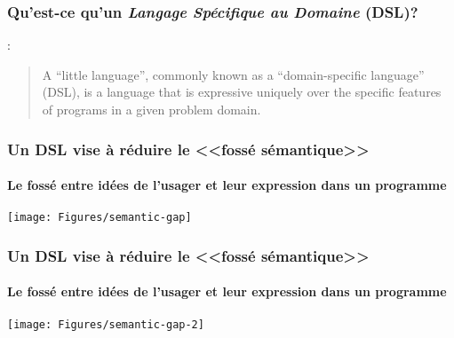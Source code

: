 \begin{frame}
\frametitle{Qu'est-ce qu'un \emph{Langage Sp\'ecifique au Domaine} (DSL)?}

\large{}:

\begin{quote}
A ``little language'', commonly known as a ``domain-specific
language'' (DSL), is a language that is \alert{expressive uniquely
over the specific features of programs in a given problem domain.}

\bigskip

\end{quote}

\NOTEvide

\end{frame}


\begin{frame}
\frametitle{Un DSL vise \`a r\'eduire le <<foss\'e
s\'emantique>>}
\framesubtitle{Le foss\'e entre id\'ees de l'usager et leur expression
dans un programme}

\hspace*{0.4cm}\texttt{[image: Figures/semantic-gap]}

\NOTE{\ }

\end{frame}

\begin{frame}
\frametitle{Un DSL vise \`a r\'eduire le <<foss\'e
s\'emantique>>}
\framesubtitle{Le foss\'e entre id\'ees de l'usager et leur expression
dans un programme}

\hspace*{0.4cm}\texttt{[image: Figures/semantic-gap-2]}

\NOTE{\ }

\end{frame}



